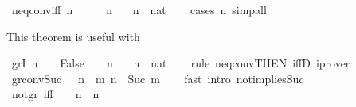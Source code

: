 \begin{isabellebody}
\isanewline
%
\endisadelimproof
\isanewline
{}\isamarkupfalse%
\ neq{}{\isacharunderscore}{\kern0pt}conv{\isacharbrackleft}{\kern0pt}iff{\isacharbrackright}{\kern0pt}{\isacharcolon}{\kern0pt}\ {\isachardoublequoteopen}n\ {\isasymnoteq}\ {}\ {\isasymlongleftrightarrow}\ {}\ {\isacharless}{\kern0pt}\ n{\isachardoublequoteclose}\isanewline
\ \ \ n\ {\isacharcolon}{\kern0pt}{\isacharcolon}{\kern0pt}\ nat\isanewline
%
\isadelimproof
\ \ %
\endisadelimproof
%
\isatagproof
{}\isamarkupfalse%
\ {\isacharparenleft}{\kern0pt}cases\ n{\isacharparenright}{\kern0pt}\ simp{\isacharunderscore}{\kern0pt}all%
\endisatagproof
{\isafoldproof}%
%
\isadelimproof
%
\endisadelimproof
%
\begin{isamarkuptext}%
This theorem is useful with %
\end{isamarkuptext}\isamarkuptrue%
\isamarkupfalse%
\ gr{}I{\isacharcolon}{\kern0pt}\ {\isachardoublequoteopen}{\isacharparenleft}{\kern0pt}n\ {\isacharequal}{\kern0pt}\ {}\ {\isasymLongrightarrow}\ False{\isacharparenright}{\kern0pt}\ {\isasymLongrightarrow}\ {}\ {\isacharless}{\kern0pt}\ n{\isachardoublequoteclose}\isanewline
\ \ \ n\ {\isacharcolon}{\kern0pt}{\isacharcolon}{\kern0pt}\ nat\isanewline
%
\isadelimproof
\ \ %
\endisadelimproof
%
\isatagproof
{}\isamarkupfalse%
\ {\isacharparenleft}{\kern0pt}rule\ neq{}{\isacharunderscore}{\kern0pt}conv{\isacharbrackleft}{\kern0pt}THEN\ iffD{}{\isacharbrackright}{\kern0pt}{\isacharparenright}{\kern0pt}\ iprover%
\endisatagproof
{\isafoldproof}%
%
\isadelimproof
\isanewline
%
\endisadelimproof
\isanewline
{}\isamarkupfalse%
\ gr{}{\isacharunderscore}{\kern0pt}conv{\isacharunderscore}{\kern0pt}Suc{\isacharcolon}{\kern0pt}\ {\isachardoublequoteopen}{}\ {\isacharless}{\kern0pt}\ n\ {\isasymlongleftrightarrow}\ {\isacharparenleft}{\kern0pt}{\isasymexists}m{\isachardot}{\kern0pt}\ n\ {\isacharequal}{\kern0pt}\ Suc\ m{\isacharparenright}{\kern0pt}{\isachardoublequoteclose}\isanewline
%
\isadelimproof
\ \ %
\endisadelimproof
%
\isatagproof
{}\isamarkupfalse%
\ {\isacharparenleft}{\kern0pt}fast\ intro{\isacharcolon}{\kern0pt}\ not{}{\isacharunderscore}{\kern0pt}implies{\isacharunderscore}{\kern0pt}Suc{\isacharparenright}{\kern0pt}%
\endisatagproof
{\isafoldproof}%
%
\isadelimproof
\isanewline
%
\endisadelimproof
\isanewline
{}\isamarkupfalse%
\ not{\isacharunderscore}{\kern0pt}gr{}\ {\isacharbrackleft}{\kern0pt}iff{\isacharbrackright}{\kern0pt}{\isacharcolon}{\kern0pt}\ {\isachardoublequoteopen}{\isasymnot}\ {}\ {\isacharless}{\kern0pt}\ n\ {\isasymlongleftrightarrow}\ n\ {\isacharequal}{\kern0pt}\ {}{\isachardoublequoteclose}\isanewline

\end{isabellebody}
